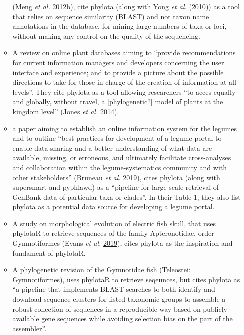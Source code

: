 \documentclass[]{article}
\begin{document}
\begin{enumerate}
\begin{itemize}
    (Meng \emph{et al.} \protect\hyperlink{ref-meng2012cloud}{2012}\protect\hyperlink{ref-meng2012cloud}{b}), cite phylota (along with Yong \emph{et al.} (\protect\hyperlink{ref-yong2010screening}{2010})) as a tool that relies on sequence
    similarity (BLAST) and not taxon name annotations in the database, for mining
    large numbers of taxa or loci, without making any control on the quality of the
    sequencing.
  \item
    A review on online plant databases aiming to ``provide recommendations for current
    information managers and developers concerning the user interface and experience;
    and to provide a picture about the possible directions to take for those in charge
    of the creation of information at all levels''. They cite phylota as a tool allowing
    researchers ``to acces equally and globally, without travel, a {[}phylogenetic?{]} model
    of plants at the kingdom level'' (Jones \emph{et al.} \protect\hyperlink{ref-jones2014trends}{2014}).
  \item
    a paper aiming to establish an online information system for the legumes and
    to outline ``best practices for development of a legume portal to enable data
    sharing and a better understanding of what data are available, missing, or erroneous,
    and ultimately facilitate cross-analyses and collaboration within the legume-systematics
    community and with other stakeholders'' (Bruneau \emph{et al.} \protect\hyperlink{ref-bruneau2019towards}{2019}), cites phylota (along with supersmart and pyphlawd) as a
    ``pipeline for large-scale retrieval of GenBank data of particular taxa or clades''.
    In their Table 1, they also list phylota as a potential data source for developing a legume portal.
  \item
    A study on morphological evolution of electric fish skull, that uses phylotaR
    to retrieve sequences of the family Apteronotidae, order Gymnotiformes (Evans \emph{et al.} \protect\hyperlink{ref-evans2019bony}{2019}),
    cites phylota as the inspiration and fundament of phylotaR.
  \item
    A phylogenetic revision of the Gymnotidae fish (Teleostei: Gymnotiformes),
    uses phylotaR to retrieve seqeunces, but cites phylota as ``a pipeline that implements
    BLAST searches to both identify and download sequence clusters for listed taxonomic
    groups to assemble a robust collection of sequences in a reproducible way based
    on publicly-available gene sequences while avoiding selection bias on the part
    of the assembler''.

\end{itemize}
\end{enumerate}
\end{document}
